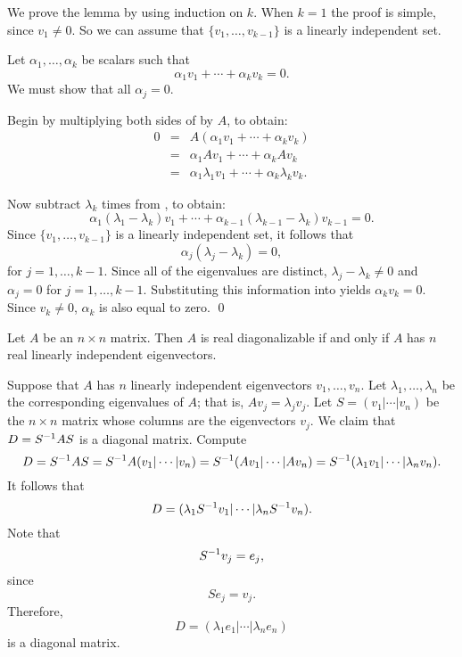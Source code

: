 \proof We prove the lemma by using induction on $k$.  When $k=1$
the proof is simple, since $v_1\neq 0$.  So we can assume that
$\{v_1,\ldots,v_{k-1}\}$ is a linearly independent set. 

Let $\alpha_1,\ldots,\alpha_k$ be scalars such that
\begin{equation}  \label{e:linindep}
\alpha_1 v_1 + \cdots + \alpha_k v_k = 0.
\end{equation}
We must show that all $\alpha_j=0$.

Begin by multiplying both sides of  by $A$, to
obtain: 
\begin{eqnarray}
0 & = & A(\alpha_1 v_1 + \cdots + \alpha_k v_k) \nonumber \\
& = & \alpha_1 Av_1 + \cdots + \alpha_k Av_k \label{e:linother}\\
& = & \alpha_1 \lambda_1 v_1 + \cdots + \alpha_k \lambda_k v_k.\nonumber
\end{eqnarray}

Now subtract $\lambda_k$ times  from ,
to obtain:
\[
\alpha_1(\lambda_1-\lambda_k)v_1 + \cdots +
\alpha_{k-1}(\lambda_{k-1}-\lambda_k)v_{k-1} = 0.
\]
Since $\{v_1,\ldots,v_{k-1}\}$ is a linearly independent set, it
follows that 
\[
\alpha_j(\lambda_j-\lambda_k)=0,
\]
for $j=1,\ldots,k-1$.  Since all of the eigenvalues are
distinct, $\lambda_j-\lambda_k\neq 0$ and $\alpha_j=0$ for
$j=1,\ldots,k-1$. Substituting this information into
 yields $\alpha_k v_k=0$.  Since $v_k\neq 0$, 
$\alpha_k$ is also equal to zero.  \qed

\begin{lemma}  \label{L:eigenv-diag}
Let $A$ be an $n\times n$ matrix.  Then $A$ is real diagonalizable if
and only if $A$ has $n$ real linearly independent 
eigenvectors.
\end{lemma}  

\proof  Suppose that $A$ has $n$ linearly independent eigenvectors 
$v_1,\ldots,v_n$.  Let $\lambda_1,\ldots,\lambda_n$ be the 
corresponding eigenvalues of $A$; that is, $Av_j=\lambda_jv_j$.
Let $S=(v_1|\cdots|v_n)$ be the $n\times n$ matrix whose columns are the 
eigenvectors $v_j$.  We claim that $D=S^{-1} AS$ is a diagonal matrix.
Compute
\[
D=S^{-1} AS=S^{-1} A(v_1|\cdots|v_n)=S^{-1}(Av_1|\cdots|Av_n)=
S^{-1}(\lambda_1v_1|\cdots|\lambda_nv_n).
\]
It follows that 
\[
D=(\lambda_1S^{-1} v_1|\cdots|\lambda_nS^{-1} v_n).
\]
Note that 
\[
S^{-1} v_j=e_j,
\]
since
\[
Se_j = v_j.
\]
Therefore,
\[
D= (\lambda_1e_1|\cdots|\lambda_ne_n)
\]
is a diagonal matrix.  

